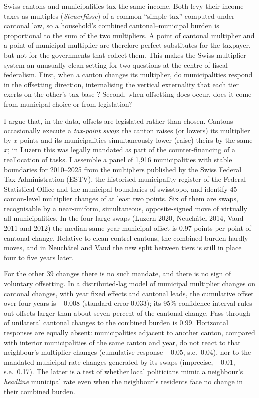 \documentclass[11pt,a4paper]{article}
\begin{document}
Swiss cantons and municipalities tax the same income. Both levy their income taxes as multiples (\emph{Steuerf\"usse}) of a common ``simple tax'' computed under cantonal law, so a household's combined cantonal--municipal burden is proportional to the sum of the two multipliers. A point of cantonal multiplier and a point of municipal multiplier are therefore perfect substitutes for the taxpayer, but not for the governments that collect them. This makes the Swiss multiplier system an unusually clean setting for two questions at the centre of fiscal federalism. First, when a canton changes its multiplier, do municipalities respond in the offsetting direction, internalising the vertical externality that each tier exerts on the other's tax base \citep[as in][]{KeenKotsogiannis2002}? Second, when offsetting does occur, does it come from municipal choice or from legislation?

I argue that, in the data, offsets are legislated rather than chosen. Cantons occasionally execute a \emph{tax-point swap}: the canton raises (or lowers) its multiplier by $x$ points and its municipalities simultaneously lower (raise) theirs by the same $x$; in Luzern this was legally mandated as part of the counter-financing of a reallocation of tasks. I assemble a panel of 1,916 municipalities with stable boundaries for 2010--2025 from the multipliers published by the Swiss Federal Tax Administration (ESTV), the historised municipality register of the Federal Statistical Office and the municipal boundaries of swisstopo, and identify 45 canton-level multiplier changes of at least two points. Six of them are swaps, recognisable by a near-uniform, simultaneous, opposite-signed move of virtually all municipalities. In the four large swaps (Luzern 2020, Neuch\^atel 2014, Vaud 2011 and 2012) the median same-year municipal offset is 0.97 points per point of cantonal change. Relative to clean control cantons, the combined burden hardly moves, and in Neuch\^atel and Vaud the new split between tiers is still in place four to five years later.

For the other 39 changes there is no such mandate, and there is no sign of voluntary offsetting. In a distributed-lag model of municipal multiplier changes on cantonal changes, with year fixed effects and cantonal leads, the cumulative offset over four years is $-0.008$ (standard error 0.033); its 95\% confidence interval rules out offsets larger than about seven percent of the cantonal change. Pass-through of unilateral cantonal changes to the combined burden is 0.99. Horizontal responses are equally absent: municipalities adjacent to another canton, compared with interior municipalities of the same canton and year, do not react to that neighbour's multiplier changes (cumulative response $-0.05$, s.e.\ 0.04), nor to the mandated municipal-rate changes generated by its swaps (imprecise, $-0.01$, s.e.\ 0.17). The latter is a test of whether local politicians mimic a neighbour's \emph{headline} municipal rate even when the neighbour's residents face no change in their combined burden.
\end{document}
